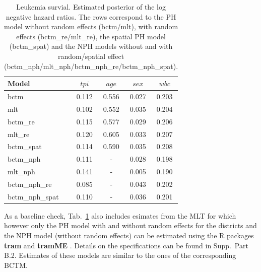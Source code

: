 \documentclass[12pt]{article}
\theoremstyle{plain}
\begin{document}
\begin{table}\footnotesize
\centering
\begin{tabular}{l|cccc}
  \hline  \hline
 Model & $\mathit{tpi}$ & $\mathit{age}$ & $\mathit{sex}$ & $\mathit{wbc}$ \\
    \hline
bctm & 0.112 & 0.556 & 0.027 & 0.203 \\
mlt & 0.102 & 0.552 & 0.035 & 0.204 \\
bctm\_re & 0.115 & 0.577 & 0.029 & 0.206  \\
mlt\_re & 0.120 & 0.605 & 0.033 & 0.207   \\
bctm\_spat & 0.114 & 0.590 & 0.035 & 0.208  \\
bctm\_nph & 0.111 & - & 0.028 & 0.198   \\
mlt\_nph & 0.141 & - & 0.005 & 0.190 \\
bctm\_nph\_re & 0.085 & - & 0.043 & 0.202   \\
bctm\_nph\_spat & 0.110 & - & 0.036 & 0.201 \\
   \hline  \hline
\end{tabular}\caption{\small  Leukemia survial. Estimated posterior of the log negative hazard ratios. The rows correspond to the PH model without random effects (bctm/mlt), with random effects (bctm\_re/mlt\_re), the spatial PH model (bctm\_spat) and the NPH models without and with random/spatial effect (bctm\_nph/mlt\_nph/bctm\_nph\_re/bctm\_nph\_spat).} \label{tab:leuk2}
\end{table}
As a baseline check,  Tab.~\ref{tab:leuk2} also includes esimates from the  MLT for which however only the PH model with and without random effects for the districts and the NPH model (without random effects) can be estimated using the R packages \textbf{tram} \citep{tram} and \textbf{tramME} \citep{tamasi2022tramme}. Details on the specifications can be found in Supp.~Part B.2. 
 Estimates of these models are similar to the ones of the corresponding BCTM.
\end{document}
